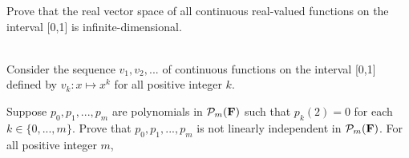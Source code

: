 \begin{exercise}
    Prove that the real vector space of all continuous real-valued functions on the interval [0,1] is infinite-dimensional. \\
\end{exercise}

\begin{solution}
    \\ Consider the sequence $v_1, v_2, ...$ of continuous functions on the interval [0,1] defined by $v_k: x \mapsto x^k$ for all positive integer $k$. \td \\
\end{solution}

\begin{exercise}
    Suppose $p_0, p_1, ..., p_m$ are polynomials in $\mathcal{P}_m(\mathbf{F})$ such that $p_k(2) = 0$ for each $k \in \{0, ..., m\}$. Prove that $p_0, p_1, ..., p_m$ is not linearly independent in $\mathcal{P}_m(\mathbf{F})$. For all positive integer $m$,  \\
\end{exercise}

\begin{solution}
    \\ \td \\ 
\end{solution}